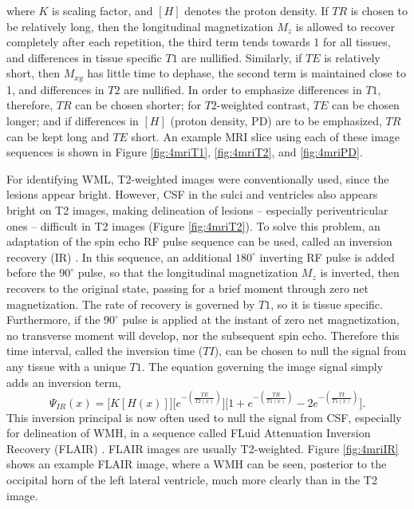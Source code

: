 where $K$ is scaling factor, and $\left[H\right]$ denotes the proton density.
If $TR$ is chosen to be relatively long, then the longitudinal magnetization $M_z$ is allowed to recover completely after each repetition, the third term tends towards 1 for all tissues, and differences in tissue specific $T1$ are nullified.
Similarly, if $TE$ is relatively short, then $M_{xy}$ has little time to dephase, the second term is maintained close to 1, and differences in $T2$ are nullified.
In order to emphasize differences in $T1$, therefore, $TR$ can be chosen shorter; for $T2$-weighted contrast, $TE$ can be chosen longer; and if differences in $[H]$ (proton density, PD) are to be emphasized, $TR$ can be kept long and $TE$ short.
An example MRI slice using each of these image sequences is shown in Figure \ref{fig:4mriT1}, \ref{fig:4mriT2}, and \ref{fig:4mriPD}.
\par
For identifying WML, T2-weighted images were conventionally used, since the lesions appear bright.
However, CSF in the sulci and ventricles also appears bright on T2 images, making delineation of lesions -- especially periventricular ones -- difficult in T2 images (Figure \ref{fig:4mriT2}).
To solve this problem, an adaptation of the spin echo RF pulse sequence can be used, called an inversion recovery (IR) \cite{Bydder1985}.
In this sequence, an additional $180^{\circ}$ inverting RF pulse is added before the $90^{\circ}$ pulse, so that the longitudinal magnetization $M_z$ is inverted, then recovers to the original state, passing for a brief moment through zero net magnetization.
The rate of recovery is governed by $T1$, so it is tissue specific.
Furthermore, if the $90^{\circ}$ pulse is applied at the instant of zero net magnetization, no transverse moment will develop, nor the subsequent spin echo.
Therefore this time interval, called the inversion time ($TI$), can be chosen to null the signal from any tissue with a unique $T1$.
The equation governing the image signal simply adds an inversion term,
\begin{equation}\label{eq:MRI-IR}
\Psi_{IR}(x) = \bigg[K \left[H(x)\right]\bigg]\bigg[e^{-\left(\frac{TE}{T2(x)}\right)}\bigg]\bigg[1 + e^{-\left(\frac{TR}{T1(x)}\right)} - 2e^{-\left(\frac{TI}{T1(x)}\right)}\bigg].
\end{equation}
This inversion principal is now often used to null the signal from CSF, especially for delineation of WMH, in a sequence called FLuid Attenuation Inversion Recovery (FLAIR) \cite{Hajnal1992}.
FLAIR images are usually T2-weighted.
Figure \ref{fig:4mriIR} shows an example FLAIR image, where a WMH can be seen, posterior to the occipital horn of the left lateral ventricle, much more clearly than in the T2 image.
